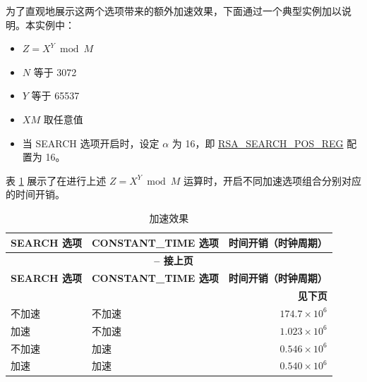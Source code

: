 \documentclass[main\_\_CN.tex]{subfiles}
\begin{document}
为了直观地展示这两个选项带来的额外加速效果，下面通过一个典型实例加以说明。本实例中：
\begin{itemize}
    \item \begin{math}Z = X^{Y} \bmod M\end{math}
    \item \begin{math}N\end{math} 等于 3072
    \item \begin{math}Y\end{math} 等于 65537
    \item \begin{math}X\end{math}\begin{math}M\end{math} 取任意值
    \item 当 SEARCH 选项开启时，设定 \begin{math} \alpha \end{math} 为 16，即 \hyperref[regdesc:RSASEARCHPOSREG]{RSA\_SEARCH\_POS\_REG} 配置为 16。
\end{itemize}

表 \ref{tab:accelerationeffect} 展示了在进行上述 \begin{math}Z = X^{Y} \bmod M\end{math} 运算时，开启不同加速选项组合分别对应的时间开销。

\begin{longtable}{ | l | l | r | }
    \caption{加速效果}\label{tab:accelerationeffect}
    \\\hline
    \rowcolor{lightgray}
    \textbf{SEARCH 选项} & \textbf{CONSTANT\_TIME 选项} & \textbf{时间开销（时钟周期）}  \\ \hline
    \endfirsthead

    \multicolumn{3}{c}{\bfseries \tablename\ \thetable{} -- 接上页}\\\hline

    \rowcolor{lightgray}
    \textbf{SEARCH 选项} & \textbf{CONSTANT\_TIME 选项} & \textbf{时间开销（时钟周期）}  \\ \hline
    \endhead

    \multicolumn{3}{r}{\textbf{见下页}} \\
    \endfoot
    \endlastfoot
    \hline

     不加速 & 不加速 & $174.7 \times 10^6$   \\ \hline
     加速   & 不加速 & $1.023 \times 10^6$   \\ \hline
     不加速 & 加速 & $0.546 \times 10^6$     \\ \hline
     加速   & 加速 & $0.540 \times 10^6$     \\ \hline
\end{longtable}
\end{document}
